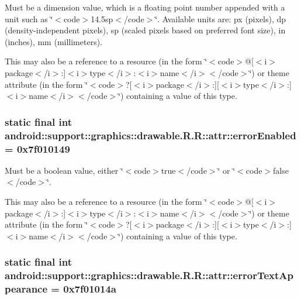 Must be a dimension value, which is a floating point number appended with a unit such as \char`\"{}$<$code$>$14.5sp$<$/code$>$\char`\"{}. Available units are: px (pixels), dp (density-independent pixels), sp (scaled pixels based on preferred font size), in (inches), mm (millimeters). 

This may also be a reference to a resource (in the form \char`\"{}$<$code$>$@\mbox{[}$<$i$>$package$<$/i$>$:\mbox{]}$<$i$>$type$<$/i$>$:$<$i$>$name$<$/i$>$$<$/code$>$\char`\"{}) or theme attribute (in the form \char`\"{}$<$code$>$?\mbox{[}$<$i$>$package$<$/i$>$:\mbox{]}\mbox{[}$<$i$>$type$<$/i$>$:\mbox{]}$<$i$>$name$<$/i$>$$<$/code$>$\char`\"{}) containing a value of this type. \hypertarget{classandroid_1_1support_1_1graphics_1_1drawable_1_1_r_1_1attr_733c2aedeb0b2e2620599960236df80b}{
\subsubsection[{errorEnabled}]{\setlength{\rightskip}{0pt plus 5cm}static final int android::support::graphics::drawable.R.R::attr::errorEnabled = 0x7f010149}}
\label{classandroid_1_1support_1_1graphics_1_1drawable_1_1_r_1_1attr_733c2aedeb0b2e2620599960236df80b}


Must be a boolean value, either \char`\"{}$<$code$>$true$<$/code$>$\char`\"{} or \char`\"{}$<$code$>$false$<$/code$>$\char`\"{}. 

This may also be a reference to a resource (in the form \char`\"{}$<$code$>$@\mbox{[}$<$i$>$package$<$/i$>$:\mbox{]}$<$i$>$type$<$/i$>$:$<$i$>$name$<$/i$>$$<$/code$>$\char`\"{}) or theme attribute (in the form \char`\"{}$<$code$>$?\mbox{[}$<$i$>$package$<$/i$>$:\mbox{]}\mbox{[}$<$i$>$type$<$/i$>$:\mbox{]}$<$i$>$name$<$/i$>$$<$/code$>$\char`\"{}) containing a value of this type. \hypertarget{classandroid_1_1support_1_1graphics_1_1drawable_1_1_r_1_1attr_3a203591267c808e75a0ec2093c01dd6}{
\subsubsection[{errorTextAppearance}]{\setlength{\rightskip}{0pt plus 5cm}static final int android::support::graphics::drawable.R.R::attr::errorTextAppearance = 0x7f01014a}}
\label{classandroid_1_1support_1_1graphics_1_1drawable_1_1_r_1_1attr_3a203591267c808e75a0ec2093c01dd6}



